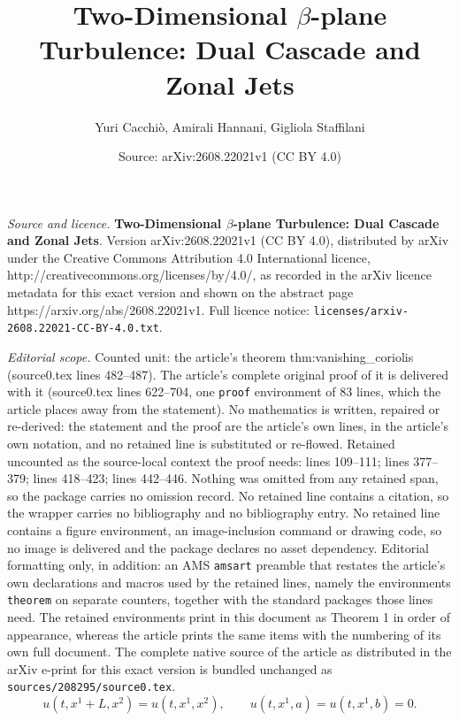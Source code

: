 \documentclass[10pt,a4paper]{amsart}
\title{\textbf{Two-Dimensional $\beta$-plane Turbulence: Dual Cascade and Zonal Jets}}
\author{Yuri Cacchiò, Amirali Hannani, Gigliola Staffilani}
\date{Source: arXiv:2608.22021v1 (CC BY 4.0)}
\begin{document}
\maketitle

\noindent\emph{Source and licence.} \textbf{Two-Dimensional $\beta$-plane Turbulence: Dual Cascade and Zonal Jets}. Version arXiv:2608.22021v1 (CC BY 4.0), distributed by arXiv under the Creative Commons Attribution 4.0 International licence, http://creativecommons.org/licenses/by/4.0/, as recorded in the arXiv licence metadata for this exact version and shown on the abstract page https://arxiv.org/abs/2608.22021v1. Full licence notice: \texttt{licenses/arxiv-2608.22021-CC-BY-4.0.txt}.\par\smallskip

\noindent\textit{Editorial scope.} Counted unit: the article's theorem thm:vanishing\_coriolis (source0.tex lines 482--487). The article's complete original proof of it is delivered with it (source0.tex lines 622--704, one \texttt{proof} environment of 83 lines, which the article places away from the statement). No mathematics is written, repaired or re-derived: the statement and the proof are the article's own lines, in the article's own notation, and no retained line is substituted or re-flowed.  Retained uncounted as the source-local context the proof needs: lines 109--111; lines 377--379; lines 418--423; lines 442--446.  Nothing was omitted from any retained span, so the package carries no omission record.  No retained line contains a citation, so the wrapper carries no bibliography and no bibliography entry.  No retained line contains a figure environment, an image-inclusion command or drawing code, so no image is delivered and the package declares no asset dependency.  Editorial formatting only, in addition: an AMS \texttt{amsart} preamble that restates the article's own declarations and macros used by the retained lines, namely the environments \texttt{theorem} on separate counters, together with the standard packages those lines need.  The retained environments print in this document as Theorem 1 in order of appearance, whereas the article prints the same items with the numbering of its own full document.  The complete native source of the article as distributed in the arXiv e-print for this exact version is bundled unchanged as \texttt{sources/208295/source0.tex}.
\begin{equation}\label{eq:boundary_conditions}
    u(t, x^1+L, x^2) = u(t, x^1, x^2), \qquad u(t, x^1, a) = u(t, x^1, b) = 0.
\end{equation}
\end{document}

